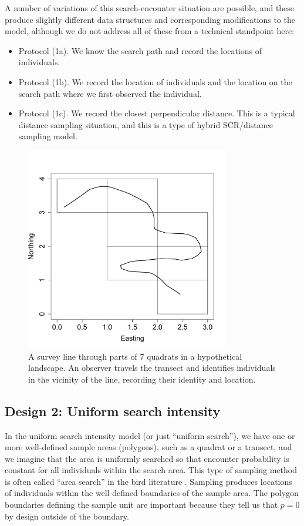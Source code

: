A number of variations of this search-encounter situation are
possible, and these produce slightly different data structures and
corresponding modifications to the model, although we do not address
all of these from a technical standpoint here:
\begin{itemize}
 \item[] Protocol (1a). We know the search path and record the
   locations of individuals. 
 \item[] Protocol (1b). We record the location of individuals and
   the location on the search path where we first observed the individual.
 \item[] Protocol (1c). We record
the closest perpendicular distance. This is a typical
   distance sampling situation, and this is a type of hybrid
   SCR/distance sampling model. 
 \end{itemize}

\begin{figure}
\centering
\includegraphics[width=3.5in,height=3.5in]{Ch15-searchencounter/figs/snakeline.png}
\caption{
A survey line through parts of 7 quadrats in a
  hypothetical landscape. An observer travels the transect and
  identifies individuals in the vicinity of the line, recording their
  identity and location.
}
\label{searchencounter.fig.snakeline}
\end{figure}


\subsection{Design 2: Uniform search intensity}

In the uniform search intensity model (or just ``uniform search''), we
have one or more well-defined sample areas (polygons), such as a
quadrat or a transect, and we imagine that the area is uniformly
searched so that encounter probability is constant for all individuals
within the search area.  This type of sampling method is often called
``area search'' in the bird literature \citep{bibby_etal:1992}.
Sampling produces locations of individuals within the well-defined
boundaries of the sample area. The polygon boundaries defining the
sample unit are important because they tell us that $p=0$ by design
outside of the boundary.

